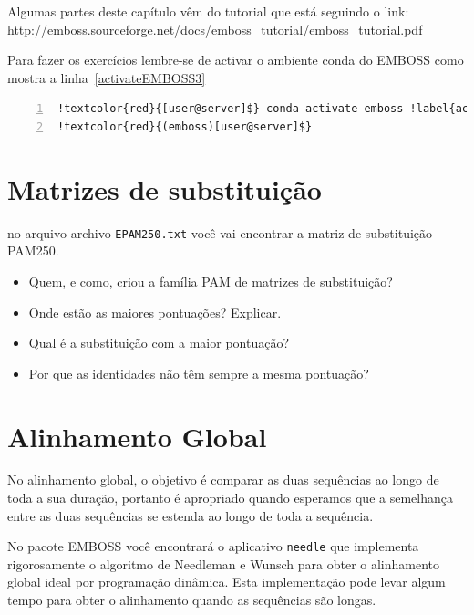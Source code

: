 \documentclass[letter,11pt]{book}
\begin{document}
Algumas partes deste capítulo vêm do tutorial que está seguindo o link: \url{http://emboss.sourceforge.net/docs/emboss_tutorial/emboss_tutorial.pdf}

Para fazer os exercícios lembre-se de activar o ambiente conda do EMBOSS como mostra a linha~\ref{activateEMBOSS3}


\begin{Verbatim}[commandchars=!\{\},numbers=left,label=carregando ambiente EMBOSS com conda,frame=topline,fontsize=\scriptsize]
!textcolor{red}{[user@server]$} conda activate emboss !label{activateEMBOSS3}
!textcolor{red}{(emboss)[user@server]$}
\end{Verbatim}


\section{Matrizes de substituição}

no arquivo archivo \Verb+EPAM250.txt+ você vai encontrar a matriz de substituição PAM250.


{
\color{red}
\begin{itemize}
\item Quem, e como, criou a família PAM de matrizes de substituição?
\item Onde estão as maiores pontuações? Explicar.
\item Qual é a substituição com a maior pontuação?
\item Por que as identidades não têm sempre a mesma pontuação?
\end{itemize}

}


\section{Alinhamento Global}

No alinhamento global, o objetivo é comparar as duas sequências ao longo de toda a sua duração, portanto é apropriado quando esperamos que a semelhança entre as duas sequências se estenda ao longo de toda a sequência.

No pacote EMBOSS você encontrará o aplicativo \Verb+needle+ que implementa rigorosamente o algoritmo de Needleman e Wunsch \citep{Needleman1970} para obter o alinhamento global ideal por programação dinâmica. Esta implementação pode levar algum tempo para obter o alinhamento quando as sequências são longas.
\end{document}
